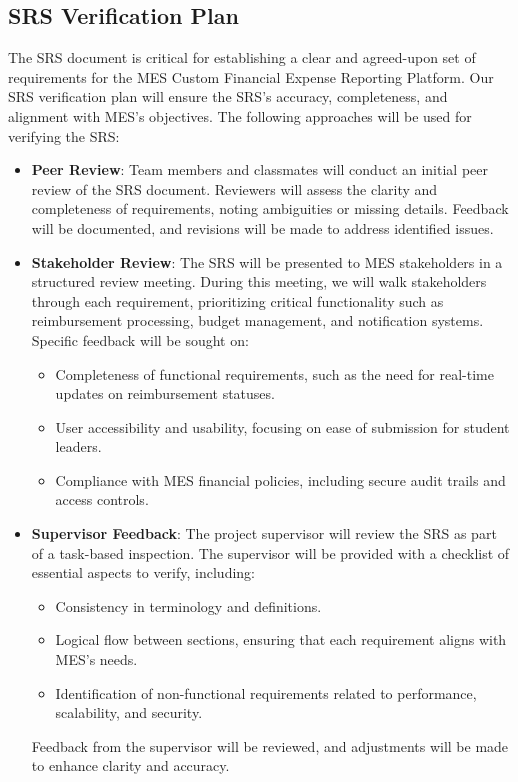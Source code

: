 \documentclass[12pt, titlepage]{article}
\begin{document}
\subsection{SRS Verification Plan}
The SRS document is critical for establishing a clear and agreed-upon set of requirements for the MES Custom Financial Expense Reporting Platform. Our SRS verification plan will ensure the SRS’s accuracy, completeness, and alignment with MES’s objectives. The following approaches will be used for verifying the SRS:

\begin{itemize}
    \item \textbf{Peer Review}: Team members and classmates will conduct an initial peer review of the SRS document. Reviewers will assess the clarity and completeness of requirements, noting ambiguities or missing details. Feedback will be documented, and revisions will be made to address identified issues.
    
    \item \textbf{Stakeholder Review}: The SRS will be presented to MES stakeholders in a structured review meeting. During this meeting, we will walk stakeholders through each requirement, prioritizing critical functionality such as reimbursement processing, budget management, and notification systems. Specific feedback will be sought on:
    \begin{itemize}
        \item Completeness of functional requirements, such as the need for real-time updates on reimbursement statuses.
        \item User accessibility and usability, focusing on ease of submission for student leaders.
        \item Compliance with MES financial policies, including secure audit trails and access controls.
    \end{itemize}
    
    \item \textbf{Supervisor Feedback}: The project supervisor will review the SRS as part of a task-based inspection. The supervisor will be provided with a checklist of essential aspects to verify, including:
    \begin{itemize}
        \item Consistency in terminology and definitions.
        \item Logical flow between sections, ensuring that each requirement aligns with MES’s needs.
        \item Identification of non-functional requirements related to performance, scalability, and security.
    \end{itemize}
    Feedback from the supervisor will be reviewed, and adjustments will be made to enhance clarity and accuracy.


\end{itemize}
\end{document}
